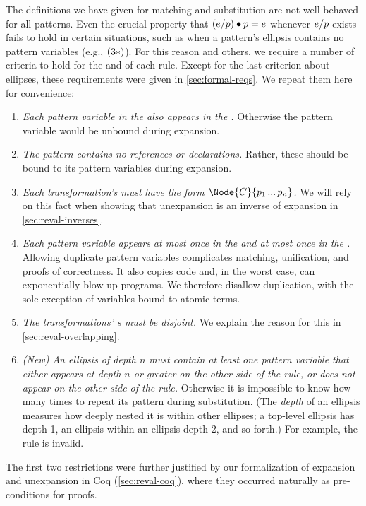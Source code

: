 The definitions we have given for matching and substitution are not
well-behaved for all patterns. Even the crucial property that
$(e / p) \bullet p = e$ whenever $e / p$ exists fails to hold in certain
situations, such as when a pattern's ellipsis contains no pattern variables (e.g.,
$(3*)$). For this reason and others, we require a number of criteria
to hold for the  and  of each rule. Except for the
last criterion about ellipses, these requirements were given in
\cref{sec:formal-reqs}. We repeat them here for convenience:
\begin{enumerate}
\item \emph{Each pattern variable in the  also appears in the
  .} Otherwise the pattern variable would be unbound during
  expansion.
\item \emph{The  pattern contains no references or declarations.} Rather, these
  should be bound to its pattern variables during expansion.
\item \emph{Each transformation's  must have the form
  $\Node{C}{p_1 \dd p_n}$.} We will rely on this fact when showing that
  unexpansion is an inverse of expansion in \cref{sec:reval-inverses}.
\item \emph{Each pattern variable appears at most once in the  and at
  most once in the .}
  Allowing duplicate pattern variables complicates matching, unification,
  and proofs of correctness. It also copies code
  and, in the worst case, can exponentially blow up programs.
  We therefore disallow duplication,
  with the sole exception of variables bound to atomic terms.
\item \emph{The transformations' s must be disjoint.} We
  explain the reason for this in \cref{sec:reval-overlapping}.
\item \emph{(New) An ellipsis of depth $n$ must contain at least one pattern variable
  that either appears at depth $n$ or greater on the other side of the
  rule, or does not appear on the other side of the rule.} Otherwise it is
  impossible to know how many times to repeat its pattern during
  substitution. (The \emph{depth} of an ellipsis measures how deeply nested
  it is within other ellipses; a top-level ellipsis has depth 1, an
  ellipsis within an ellipsis depth 2, and so forth.) For example,
  the rule  is invalid.
\end{enumerate}
The first two restrictions were further justified by our formalization of
expansion and unexpansion in Coq (\cref{sec:reval-coq}), 
where they occurred naturally as pre-conditions
for proofs.


